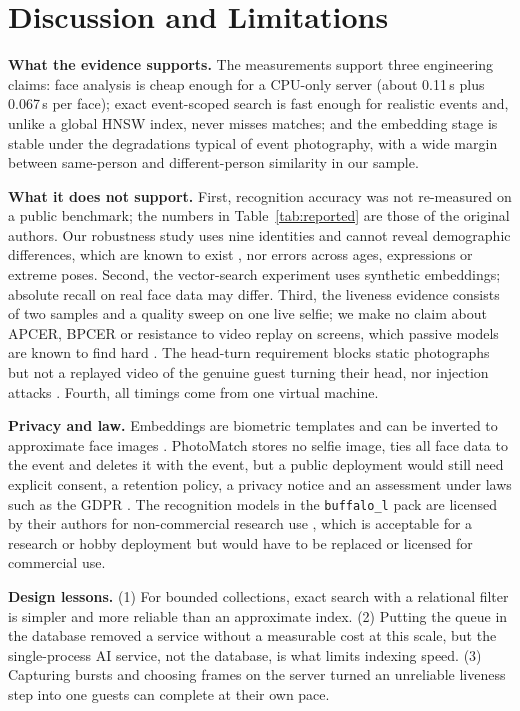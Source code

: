 \documentclass[conference]{IEEEtran}
\begin{document}
\section{Discussion and Limitations}\label{sec:discussion}
\textbf{What the evidence supports.} The measurements support three engineering claims: face analysis is cheap enough for a CPU-only server (about 0.11\,s plus 0.067\,s per face); exact event-scoped search is fast enough for realistic events and, unlike a global HNSW index, never misses matches; and the embedding stage is stable under the degradations typical of event photography, with a wide margin between same-person and different-person similarity in our sample.

\textbf{What it does not support.} First, recognition accuracy was not re-measured on a public benchmark; the numbers in Table~\ref{tab:reported} are those of the original authors. Our robustness study uses nine identities and cannot reveal demographic differences, which are known to exist \cite{buolamwini2018,grother2019frvt}, nor errors across ages, expressions or extreme poses. Second, the vector-search experiment uses synthetic embeddings; absolute recall on real face data may differ. Third, the liveness evidence consists of two samples and a quality sweep on one live selfie; we make no claim about APCER, BPCER or resistance to video replay on screens, which passive models are known to find hard \cite{yu2023survey}. The head-turn requirement blocks static photographs but not a replayed video of the genuine guest turning their head, nor injection attacks \cite{tolosana2020}. Fourth, all timings come from one virtual machine.

\textbf{Privacy and law.} Embeddings are biometric templates and can be inverted to approximate face images \cite{mai2019reconstruction}. PhotoMatch stores no selfie image, ties all face data to the event and deletes it with the event, but a public deployment would still need explicit consent, a retention policy, a privacy notice and an assessment under laws such as the GDPR \cite{gdpr}. The recognition models in the \texttt{buffalo\_l} pack are licensed by their authors for non-commercial research use \cite{insightface}, which is acceptable for a research or hobby deployment but would have to be replaced or licensed for commercial use.

\textbf{Design lessons.} (1) For bounded collections, exact search with a relational filter is simpler and more reliable than an approximate index. (2) Putting the queue in the database removed a service without a measurable cost at this scale, but the single-process AI service, not the database, is what limits indexing speed. (3) Capturing bursts and choosing frames on the server turned an unreliable liveness step into one guests can complete at their own pace.
\end{document}

